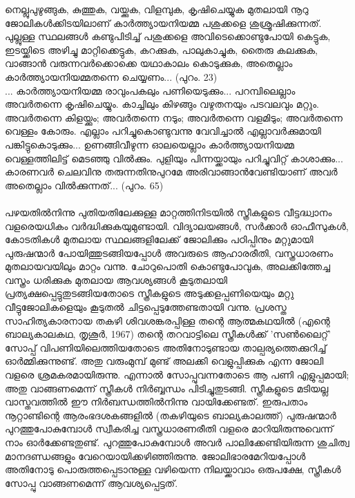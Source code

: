 \begin{tcolorbox}{}
നെല്ലുപുഴുങ്ങുക, കുത്തുക, വയ്ക്കുക, വിളമ്പുക, കൃഷിചെയ്യുക മുതലായി നൂറു ജോലികൾക്കിടയിലാണ് കാർത്ത്യായനിയമ്മ പശുക്കളെ ശുശ്രൂഷിക്കുന്നത്. പുല്ലുള്ള സ്ഥലങ്ങൾ കണ്ടുപിടിച്ച് പശുക്കളെ അവിടെക്കൊണ്ടുപോയി കെട്ടുക, ഇടയ്ക്കിടെ അഴിച്ചു മാറ്റിക്കെട്ടുക, കറക്കുക, പാലുകാച്ചുക, തൈരു കലക്കുക, വാങ്ങാൻ വരുന്നവർക്കൊക്കെ യഥാകാലം കൊടുക്കുക, അതെല്ലാം കാർത്ത്യായനിയമ്മതന്നെ ചെയ്യണം... (പുറം. 23)\\

... കാർത്ത്യായനിയമ്മ രാവുംപകലും പണിയെടുക്കും... പറമ്പിലെല്ലാം അവർതന്നെ കൃഷിചെയ്യും. കാച്ചിലും കിഴങ്ങും വഴുതനയും പടവലവും മറ്റും. അവർതന്നെ കിളയ്ക്കും; അവർതന്നെ നടും; അവർതന്നെ വളമിടും; അവർതന്നെ വെള്ളം കോരും. എല്ലാം പറിച്ചുകൊണ്ടുവന്നു വേവിച്ചാൽ എല്ലാവർക്കുമായി പങ്കിട്ടുകൊടുക്കും... ഉണങ്ങിവീഴുന്ന ഓലയെല്ലാം കാർത്ത്യായനിയമ്മ വെള്ളത്തിലിട്ട് മെടഞ്ഞു വിൽക്കും. പുളിയും പിന്നയ്ക്കായും പറിച്ചുവിറ്റ് കാശാക്കും... കാരണവർ ചെലവിനു തരുന്നതിനുപുറമേ അരിവാങ്ങാൻവേണ്ടിയാണ് അവർ അതെല്ലാം വിൽക്കുന്നത്... (പുറം. 65)

\end{tcolorbox}

\paragraph{}പഴയതിൽനിന്നു പുതിയതിലേക്കുള്ള മാറ്റത്തിനിടയിൽ സ്ത്രീകളുടെ വീട്ടദ്ധ്വാനം വളരെയധികം വർദ്ധിക്കുകയുമുണ്ടായി. വിദ്യാലയങ്ങൾ, സർക്കാർ ഓഫീസുകൾ, കോടതികൾ മുതലായ സ്ഥലങ്ങളിലേക്ക് ജോലിക്കും പഠിപ്പിനും മറ്റുമായി പുരുഷന്മാർ പോയിത്തുടങ്ങിയപ്പോൾ അവരുടെ ആഹാരരീതി, വസ്ത്രധാരണം മുതലായവയിലും മാറ്റം വന്നു. ചോറുപൊതി കൊണ്ടുപോവുക, അലക്കിത്തേച്ച വസ്ത്രം ധരിക്കുക മുതലായ ആവശ്യങ്ങൾ കൂടുതലായി പ്രത്യക്ഷപ്പെട്ടുതുടങ്ങിയതോടെ സ്ത്രീകളുടെ അടുക്കളപ്പണിയെയും മറ്റു വീട്ടുജോലികളെയും കൂടുതൽ ചിട്ടപ്പെടുത്തേണ്ടതായി വന്നു. പ്രശസ്ത സാഹിത്യകാരനായ തകഴി ശിവശങ്കരപ്പിള്ള തന്റെ ആത്മകഥയിൽ (എന്റെ ബാല്യകാലകഥ, തൃശൂർ, 1967) തന്റെ തറവാട്ടിലെ സ്ത്രീകൾക്ക് 'സൺലൈറ്റ്' സോപ്പ് വിപണിയിലെത്തിയതോടെ അതിനോടുണ്ടായ താല്പര്യത്തെക്കുറിച്ച് ഓർമ്മിക്കുന്നുണ്ട്. അതു വരുംമുമ്പ് മുണ്ട് അലക്കി വെളുപ്പിക്കുക എന്ന ജോലി വളരെ ശ്രമകരമായിരുന്നു. എന്നാൽ സോപ്പുവന്നതോടെ ആ പണി എളുപ്പമായി; അതു വാങ്ങണമെന്ന് സ്ത്രീകൾ നിർബ്ബന്ധം പിടിച്ചുതുടങ്ങി. സ്ത്രീകളുടെ മടിയല്ല വാസ്തവത്തിൽ ഈ നിർബന്ധത്തിൽനിന്നു വായിക്കേണ്ടത്. ഇരുപതാം നൂറ്റാണ്ടിന്റെ ആരംഭദശകങ്ങളിൽ (തകഴിയുടെ ബാല്യകാലത്ത്) പുരുഷന്മാർ പുറത്തുപോകുമ്പോൾ സ്വീകരിച്ച വസ്ത്രധാരണരീതി വളരെ മാറിയിരുന്നുവെന്ന് നാം ഓർക്കേണ്ടതുണ്ട്. പുറത്തുപോകുമ്പോൾ അവർ പാലിക്കേണ്ടിയിരുന്ന ശുചിത്വ മാനദണ്ഡങ്ങളും വേറെയായിക്കഴിഞ്ഞിരുന്നു. ജോലിഭാരമേറിയപ്പോൾ അതിനോടു പൊരുത്തപ്പെടാനുള്ള വഴിയെന്ന നിലയ്ക്കാവാം ഒരുപക്ഷേ, സ്ത്രീകൾ സോപ്പു വാങ്ങണമെന്ന് ആവശ്യപ്പെട്ടത്.


